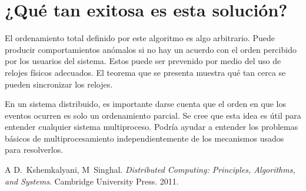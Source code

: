 \section{¿Qué tan exitosa es esta solución?} 
El ordenamiento total definido por este algoritmo es algo arbitrario. Puede producir comportamientos anómalos si no hay un acuerdo con el orden percibido por los usuarios del sistema. Estos puede ser prevenido por medio del uso de relojes físicos adecuados. El teorema que se presenta muestra qué tan cerca se pueden sincronizar los relojes. 

En un sistema distribuido, es importante darse cuenta que el orden en que los eventos ocurren es solo un ordenamiento parcial. Se cree que esta idea es útil para entender cualquier sistema multiproceso. Podría ayudar a entender los problemas básicos de multiprocesamiento independientemente de los mecanismos usados para resolverlos.


\begin{thebibliography}{1}

\bibitem
A D.~Kshemkalyani, M~Singhal. \emph{Distributed Computing: Principles, Algorithms, and Systems}. Cambridge University Press. 2011.


\end{thebibliography}











